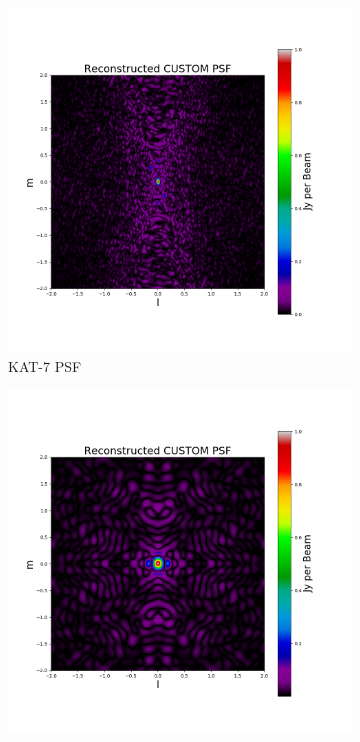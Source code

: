 \begin{figure}[H]
  \centering
  \begin{subfigure}[b]{0.3\textwidth}
    \includegraphics[width=\textwidth]{images/KAT_7_PSF.png}
    \caption{KAT-7 PSF}
    \label{fig:1}
  \end{subfigure}
  \begin{subfigure}[b]{0.3\textwidth}
    \includegraphics[width=\textwidth]{images/HERA_19_PSF.png}

\end{subfigure}
\end{figure}
